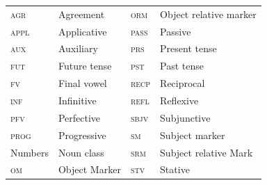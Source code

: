 \documentclass[output=paper,colorlinks,citecolor=brown]{langscibook}
\begin{document}
\begin{table}
    \begin{tabular}{llll}
         \textsc{agr}   & Agreement     & \textsc{orm}  & Object relative marker\\
         \textsc{appl}  & Applicative   & \textsc{pass} & Passive\\
         \textsc{aux}   & Auxiliary     & \textsc{prs}  & Present tense\\
         \textsc{fut}   & Future tense  & \textsc{pst}  & Past tense\\
         \textsc{fv}    & Final vowel   & \textsc{recp} & Reciprocal\\
         \textsc{inf}   & Infinitive    & \textsc{refl} & Reflexive\\
         \textsc{pfv}   & Perfective    & \textsc{sbjv} & Subjunctive\\
         \textsc{prog}  & Progressive   & \textsc{sm}   & Subject marker\\
         Numbers        & Noun class    & \textsc{srm}  & Subject relative Mark\\
         \textsc{om}    & Object Marker & \textsc{stv}  & Stative\\
    \end{tabular}
\end{table}



\sloppy\printbibliography[heading=subbibliography,notkeyword=this]
\end{document}
